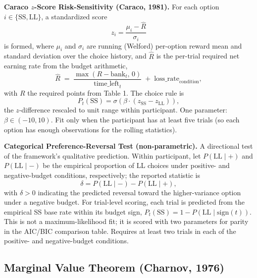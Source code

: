 \documentclass[12pt]{article}
\begin{document}
\textbf{Caraco $z$-Score Risk-Sensitivity (Caraco, 1981).} For each option $i \in \{\mathrm{SS}, \mathrm{LL}\}$, a standardized score
\[
z_i = \frac{\mu_i - \hat{R}}{\sigma_i}
\]
is formed, where $\mu_i$ and $\sigma_i$ are running (Welford) per-option reward mean and standard deviation over the choice history, and $\hat{R}$ is the per-trial required net earning rate from the budget arithmetic,
\[
\hat{R} \;=\; \frac{\max(R - \mathrm{bank}_t,\, 0)}{\mathrm{time\_left}_t} \;+\; \mathrm{loss\_rate}_{\text{condition}},
\]
with $R$ the required points from Table 1. The choice rule is
\[
P_t(\mathrm{SS}) = \sigma\!\left( \beta \cdot (z_{\mathrm{SS}} - z_{\mathrm{LL}}) \right),
\]
the $z$-difference rescaled to unit range within participant. One parameter: $\beta \in (-10, 10)$. Fit only when the participant has at least five trials (so each option has enough observations for the rolling statistics).

\textbf{Categorical Preference-Reversal Test (non-parametric).} A directional test of the framework's qualitative prediction. Within participant, let $P(\mathrm{LL} \mid +)$ and $P(\mathrm{LL} \mid -)$ be the empirical proportion of LL choices under positive- and negative-budget conditions, respectively; the reported statistic is
\[
\delta = P(\mathrm{LL} \mid -) - P(\mathrm{LL} \mid +),
\]
with $\delta > 0$ indicating the predicted reversal toward the higher-variance option under a negative budget. For trial-level scoring, each trial is predicted from the empirical SS base rate within its budget sign, $P_t(\mathrm{SS}) = 1 - P(\mathrm{LL} \mid \mathrm{sign}(t))$. This is not a maximum-likelihood fit; it is scored with two parameters for parity in the AIC/BIC comparison table. Requires at least two trials in each of the positive- and negative-budget conditions.

\subsection*{Marginal Value Theorem (Charnov, 1976)}
\end{document}
